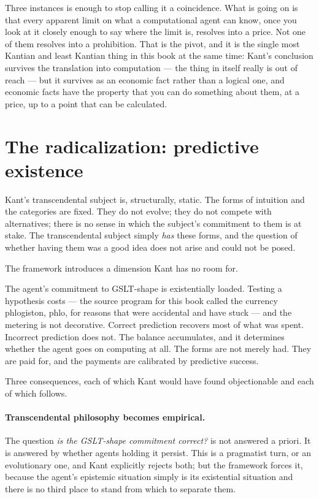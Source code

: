 Three instances is enough to stop calling it a coincidence.
What is going on is that every apparent limit on what a
computational agent can know, once you look at it closely enough to
say where the limit is, resolves into a price.
Not one of them resolves into a prohibition.
That is the pivot, and it is the single most Kantian and least
Kantian thing in this book at the same time: Kant's conclusion
survives the translation into computation --- the thing in itself
really is out of reach --- but it survives as an economic fact
rather than a logical one, and economic facts have the property
that you can do something about them, at a price, up to a point
that can be calculated.

\section{The radicalization: predictive existence}
\label{sec:kant-radical}

Kant's transcendental subject is, structurally, static.
The forms of intuition and the categories are fixed.
They do not evolve; they do not compete with alternatives; there is
no sense in which the subject's commitment to them is at stake.
The transcendental subject simply \emph{has} these forms, and the
question of whether having them was a good idea does not arise and
could not be posed.

The framework introduces a dimension Kant has no room for.

The agent's commitment to GSLT-shape is existentially loaded.
Testing a hypothesis costs --- the source program for this book
called the currency phlogiston, phlo, for reasons that were
accidental and have stuck --- and the metering is not decorative.
Correct prediction recovers most of what was spent.
Incorrect prediction does not.
The balance accumulates, and it determines whether the agent goes
on computing at all.
The forms are not merely had.
They are paid for, and the payments are calibrated by predictive
success.

Three consequences, each of which Kant would have found
objectionable and each of which follows.

\paragraph{Transcendental philosophy becomes empirical.}
The question \emph{is the GSLT-shape commitment correct?} is not
answered a priori.
It is answered by whether agents holding it persist.
This is a pragmatist turn, or an evolutionary one, and Kant
explicitly rejects both; but the framework forces it, because the
agent's epistemic situation simply is its existential situation and
there is no third place to stand from which to separate them.


